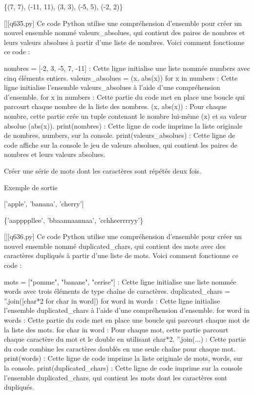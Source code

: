 \{(7, 7), (-11, 11), (3, 3), (-5, 5), (-2, 2)\}
        \par
        \begin{solution}
            \renewcommand{\nomfichier}{q635.py}
            \pythonfile{\chemincode \nomfichier}[][\nomfichier]
            Ce code Python utilise une compréhension d'ensemble pour créer un nouvel ensemble nommé valeurs_absolues, qui contient des paires de nombres et leurs valeurs absolues à partir d'une liste de nombres. Voici comment fonctionne ce code :

    nombres = [-2, 3, -5, 7, -11] : Cette ligne initialise une liste nommée numbers avec cinq éléments entiers.
    valeurs_absolues = {(x, abs(x)) for x in numbers} : Cette ligne initialise l'ensemble valeurs_absolues à l'aide d'une compréhension d'ensemble.
        for x in numbers : Cette partie du code met en place une boucle qui parcourt chaque nombre de la liste des nombres.
        (x, abs(x)) : Pour chaque nombre, cette partie crée un tuple contenant le nombre lui-même (x) et sa valeur absolue (abs(x)).
    print(nombres) : Cette ligne de code imprime la liste originale de nombres, numbers, sur la console.
    print(valeurs_absolues) : Cette ligne de code affiche sur la console le jeu de valeurs absolues, qui contient les paires de nombres et leurs valeurs absolues.
        \end{solution}
        

        \question
        Créer une série de mots dont les caractères sont répétés deux fois.

Exemple de sortie

['apple', 'banana', 'cherry']

\{'aappppllee', 'bbaannaannaa', 'cchheerrrryy'\}
        \par
        \begin{solution}
            \renewcommand{\nomfichier}{q636.py}
            \pythonfile{\chemincode \nomfichier}[][\nomfichier]
            Ce code Python utilise une compréhension d'ensemble pour créer un nouvel ensemble nommé duplicated_chars, qui contient des mots avec des caractères dupliqués à partir d'une liste de mots. Voici comment fonctionne ce code :

    mots = ["pomme", "banane", "cerise"] : Cette ligne initialise une liste nommée words avec trois éléments de type chaîne de caractères.
    duplicated_chars = {''.join([char*2 for char in word]) for word in words} : Cette ligne initialise l'ensemble duplicated_chars à l'aide d'une compréhension d'ensemble.
        for word in words : Cette partie du code met en place une boucle qui parcourt chaque mot de la liste des mots.
        for char in word : Pour chaque mot, cette partie parcourt chaque caractère du mot et le double en utilisant char*2.
        ''.join(...) : Cette partie du code combine les caractères doublés en une seule chaîne pour chaque mot.
    print(words) : Cette ligne de code imprime la liste originale de mots, words, sur la console.
    print(duplicated_chars) : Cette ligne de code imprime sur la console l'ensemble duplicated_chars, qui contient les mots dont les caractères sont dupliqués.
        \end{solution}
        

